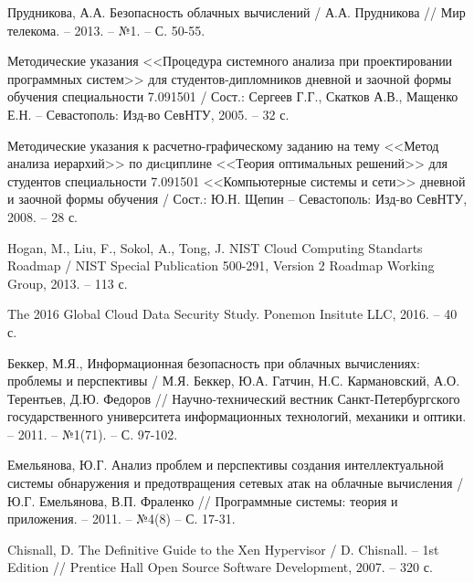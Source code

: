 \begingroup 
\renewcommand{\section}[2]{\anonsection{Библиографический список}}
\begin{thebibliography}{00}

    Прудникова, А.А.
    Безопасность облачных вычислений /
    А.А. Прудникова //
    Мир телекома. -- 2013. -- №1. -- С. 50-55.

    Методические указания <<Процедура системного анализа при проектировании программных систем>>
    для студентов-дипломников дневной и заочной формы обучения специальности 7.091501 /
    Сост.: Сергеев Г.Г., Скатков А.В., Мащенко Е.Н. -- Севастополь:
    Изд-во СевНТУ, 2005. -- 32 с.

    Методические указания к расчетно-графическому заданию
    на тему <<Метод анализа иерархий>>  по диcциплине <<Теория оптимальных решений>>
    для студентов специальности 7.091501 <<Компьютерные системы и сети>>
    дневной и заочной формы обучения /
    Сост.: Ю.Н. Щепин -- Севастополь:
    Изд-во СевНТУ, 2008. -- 28 с.

    Hogan, M., Liu, F., Sokol, A., Tong, J.
    NIST Cloud Computing Standarts Roadmap /
    NIST Special Publication 500-291, Version 2
    Roadmap Working Group, 2013. -- 113 с.

    The 2016 Global Cloud Data Security Study.
    Ponemon Insitute LLC, 2016. -- 40 с.

    Беккер, М.Я.,
    Информационная безопасность при облачных вычислениях: проблемы и перспективы /
    М.Я. Беккер, Ю.А. Гатчин, Н.С. Кармановский, А.О. Терентьев, Д.Ю. Федоров //
    Научно-технический вестник Санкт-Петербургского государственного университета информационных технологий, механики и оптики. -- 2011. -- №1(71). -- С. 97-102.

    Емельянова, Ю.Г.
    Анализ проблем и перспективы создания интеллектуальной системы обнаружения и предотвращения сетевых атак на облачные вычисления /
    Ю.Г. Емельянова, В.П. Фраленко //
    Программные системы: теория и приложения. -- 2011. -- №4(8) -- С. 17-31.

    Chisnall, D.
    The Definitive Guide to the Xen Hypervisor /
    D. Chisnall. --
    1st Edition //
    Prentice Hall Open Source Software Development, 2007. -- 320 с.


\end{thebibliography}
